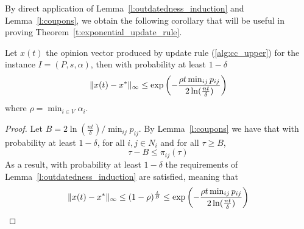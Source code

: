 By direct application of Lemma~\ref{l:outdatedness_induction} and
Lemma~\ref{l:coupons}, we obtain the following corollary that
will be useful in proving Theorem~\ref{t:exponential_update_rule}.
\begin{corollary}\label{cor:window}
Let $x(t)$ the opinion vector produced by update rule (\ref{alg:cc_upper})
for the instance $I=(P,s,\alpha)$,
then with probability at least $1-\delta$
\[\norm{\infty}{x(t)-x^*} %
\leq \exp \lp(-\frac{\rho t\min_{ij}p_{ij}}{2\ln( \frac{nt}{\delta})} \rp)\]
where $\rho = \min_{i\in V}\alpha_i$.
\end{corollary}
\begin{proof}
Let $B=2\ln(\frac{nt}{\delta})/\min_{ij}p_{ij}$. By Lemma~\ref{l:coupons}
we have that with probability at least $1-\delta$, for all $i,j\in N_i$ and
for all $\tau \geq B$, \[\tau -B \leq \pi_{ij}(\tau)  \]
As a result, with probability at least $1-\delta$ the requirements
of Lemma~\ref{l:outdatedness_induction} are satisfied, meaning that
\[\| x(t)-x^* \|_{\infty} \leq (1-\rho)^{\frac{t}{B}}
\leq \exp \left(-\frac{\rho t\min_{ij}p_{ij}}{2\ln( \frac{nt}{\delta})} \right)\]
\end{proof}

